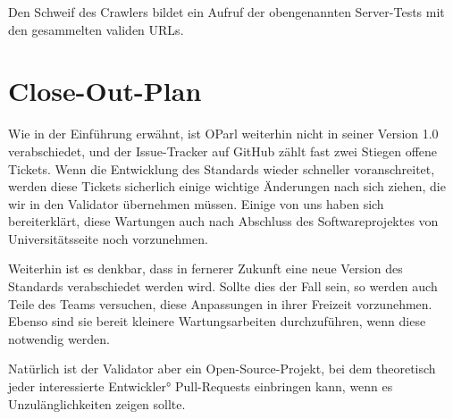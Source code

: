 \documentclass[12pt, fleqn]{scrartcl}
\begin{document}
Den Schweif des Crawlers bildet ein Aufruf der obengenannten Server-Tests mit den gesammelten validen URLs.

\section{Close-Out-Plan}

Wie in der Einführung erwähnt, ist OParl weiterhin nicht in seiner Version 1.0 verabschiedet, und der Issue-Tracker auf GitHub zählt fast zwei Stiegen offene Tickets. Wenn die Entwicklung des Standards wieder schneller voranschreitet, werden diese Tickets sicherlich einige wichtige Änderungen nach sich ziehen, die wir in den Validator übernehmen müssen. Einige von uns haben sich bereiterklärt, diese Wartungen auch nach Abschluss des Softwareprojektes von Universitätsseite noch vorzunehmen.

Weiterhin ist es denkbar, dass in fernerer Zukunft eine neue Version des Standards verabschiedet werden wird. Sollte dies der Fall sein, so werden auch Teile des Teams versuchen, diese Anpassungen in ihrer Freizeit vorzunehmen. Ebenso sind sie bereit kleinere Wartungsarbeiten durchzuführen, wenn diese notwendig werden.

Natürlich ist der Validator aber ein Open-Source-Projekt, bei dem theoretisch jeder interessierte Entwickler° Pull-Requests einbringen kann, wenn es Unzulänglichkeiten zeigen sollte.


{}
\setlength\bibitemsep{0pt}
\printbibliography
\end{document}
